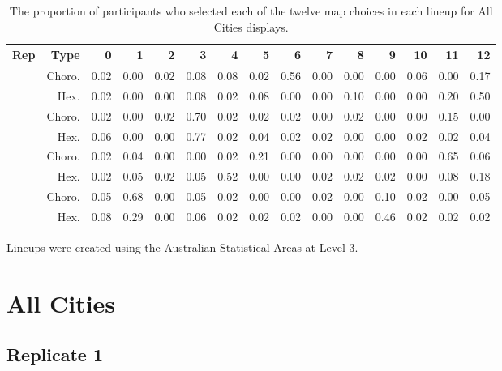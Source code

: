 \documentclass{monashthesis}
\begin{document}
\begin{table}

\caption{\label{tab:choice-all}The proportion of participants who selected each of the twelve map choices in each lineup for All Cities displays.}
\centering
\begin{tabular}[t]{rrrrrrrrrrrrrrr}
\toprule
Rep & Type & 0 & 1 & 2 & 3 & 4 & 5 & 6 & 7 & 8 & 9 & 10 & 11 & 12\\
\midrule
 & Choro. & 0.02 & 0.00 & 0.02 & 0.08 & 0.08 & 0.02 & 0.56 & 0.00 & 0.00 & 0.00 & 0.06 & 0.00 & 0.17\\
\cmidrule{2-15}
\multirow{-2}{*}{\raggedleft\arraybackslash 1} & Hex. & 0.02 & 0.00 & 0.00 & 0.08 & 0.02 & 0.08 & 0.00 & 0.00 & 0.10 & 0.00 & 0.00 & 0.20 & 0.50\\
\cmidrule{1-15}
 & Choro. & 0.02 & 0.00 & 0.02 & 0.70 & 0.02 & 0.02 & 0.02 & 0.00 & 0.02 & 0.00 & 0.00 & 0.15 & 0.00\\
\cmidrule{2-15}
\multirow{-2}{*}{\raggedleft\arraybackslash 2} & Hex. & 0.06 & 0.00 & 0.00 & 0.77 & 0.02 & 0.04 & 0.02 & 0.02 & 0.00 & 0.00 & 0.02 & 0.02 & 0.04\\
\cmidrule{1-15}
 & Choro. & 0.02 & 0.04 & 0.00 & 0.00 & 0.02 & 0.21 & 0.00 & 0.00 & 0.00 & 0.00 & 0.00 & 0.65 & 0.06\\
\cmidrule{2-15}
\multirow{-2}{*}{\raggedleft\arraybackslash 3} & Hex. & 0.02 & 0.05 & 0.02 & 0.05 & 0.52 & 0.00 & 0.00 & 0.02 & 0.02 & 0.02 & 0.00 & 0.08 & 0.18\\
\cmidrule{1-15}
 & Choro. & 0.05 & 0.68 & 0.00 & 0.05 & 0.02 & 0.00 & 0.00 & 0.02 & 0.00 & 0.10 & 0.02 & 0.00 & 0.05\\
\cmidrule{2-15}
\multirow{-2}{*}{\raggedleft\arraybackslash 4} & Hex. & 0.08 & 0.29 & 0.00 & 0.06 & 0.02 & 0.02 & 0.02 & 0.00 & 0.00 & 0.46 & 0.02 & 0.02 & 0.02\\
\bottomrule
\end{tabular}
\end{table}

Lineups were created using the Australian Statistical Areas at Level 3.

\hypertarget{all-cities}{%
\section{All Cities}\label{all-cities}}

\hypertarget{replicate-1}{%
\subsection{Replicate 1}\label{replicate-1}}
\end{document}
